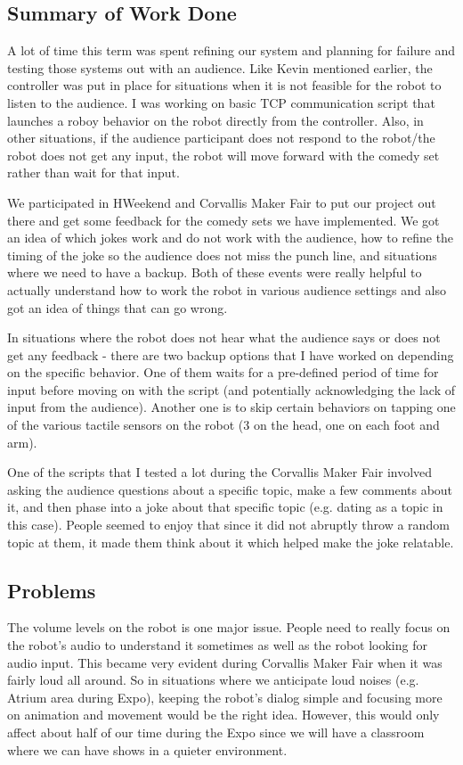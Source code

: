 \documentclass[onecolumn, draftclsnofoot,10pt, compsoc]{IEEEtran}
\begin{document}
\subsection{Summary of Work Done}
A lot of time this term was spent refining our system and planning for failure and testing those systems out with an audience. Like Kevin mentioned earlier, the controller was put in place for situations when it is not feasible for the robot to listen to the audience. I was working on basic TCP communication script that launches a roboy behavior on the robot directly from the controller.  Also, in other situations, if the audience participant does not respond to the robot/the robot does not get any input, the robot will move forward with the comedy set rather than wait for that input.

We participated in HWeekend and Corvallis Maker Fair to put our project out there and get some feedback for the comedy sets we have implemented. We got an idea of which jokes work and do not work with the audience, how to refine the timing of the joke so the audience does not miss the punch line, and situations where we need to have a backup. Both of these events were really helpful to actually understand how to work the robot in various audience settings and also got an idea of things that can go wrong.

In situations where the robot does not hear what the audience says or does not get any feedback - there are two backup options that I have worked on depending on the specific behavior. One of them waits for a pre-defined period of time for input before moving on with the script (and potentially acknowledging the lack of input from the audience). Another one is to skip certain behaviors on tapping one of the various tactile sensors on the robot (3 on the head, one on each foot and arm).

One of the scripts that I tested a lot during the Corvallis Maker Fair involved asking the audience questions about a specific topic, make a few comments about it, and then phase into a joke about that specific topic (e.g. dating as a topic in this case). People seemed to enjoy that since it did not abruptly throw a random topic at them, it made them think about it which helped make the joke relatable.

\subsection{Problems}
The volume levels on the robot is one major issue. People need to really focus on the robot's audio to understand it sometimes as well as the robot looking for audio input. This became very evident during Corvallis Maker Fair when it was fairly loud all around. So in situations where we anticipate loud noises (e.g. Atrium area during Expo), keeping the robot's dialog simple and focusing more on animation and movement would be the right idea. However, this would only affect about half of our time during the Expo since we will have a classroom where we can have shows in a quieter environment.
\end{document}
